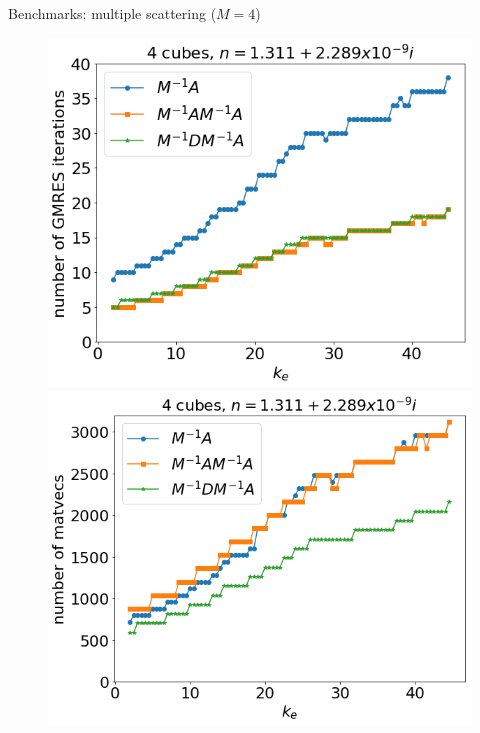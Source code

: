 \documentclass[12pt]{beamer}
\begin{document}
\begin{frame}{Benchmarks: multiple scattering ($M=4$)}
    \begin{figure}
\centering
    \includegraphics[width = 0.49 \textwidth]{Figures/iterations_multiple_low.png}
    \includegraphics[width = 0.49 \textwidth]{Figures/matvecs_multiple_low.png}
\end{figure}
\end{frame}



\end{document}
